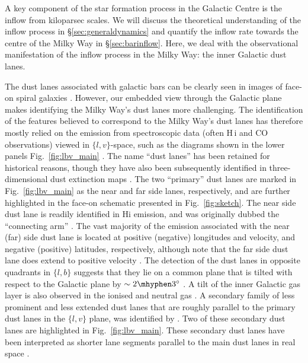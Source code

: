 A key component of the star formation process in the Galactic Centre is the inflow from kiloparsec scales. We will discuss the theoretical understanding of the inflow process in \S\ref{sec:generaldynamics} and quantify the inflow rate towards the centre of the Milky Way in \S\ref{sec:barinflow}. Here, we deal with the observational manifestation of the inflow process in the Milky Way: the inner Galactic dust lanes. 

The dust lanes associated with galactic bars can be clearly seen in images of face-on spiral galaxies \citep{Sandage1961,Knapen2002, Comeron2009, Lee2022}. However, our embedded view through the Galactic plane makes identifying the Milky Way's dust lanes more challenging. The identification of the features believed to correspond to the Milky Way's dust lanes has therefore mostly relied on the emission from spectroscopic data (often H\,{\sc i} and CO observations) viewed in $\{l,v\}$-space, such as the diagrams shown in the lower panels Fig.~\ref{fig:lbv_main} \citep[e.g.][]{Fux1999}. The name ``dust lanes'' has been retained for historical reasons, though they have also been subsequently identified in three-dimensional dust extinction maps \citep{Marshall2008}. The two ``primary'' dust lanes are marked in Fig.~\ref{fig:lbv_main} as the near and far side lanes, respectively, and are further highlighted in the face-on schematic presented in Fig.~\ref{fig:sketch}. The near side dust lane is readily identified in H{\sc i} emission, and was originally dubbed the ``connecting arm'' \citep[][]{Cohen1976, McClure-Griffiths2012}. The vast majority of the emission associated with the near (far) side dust lane is located at positive (negative) longitudes and velocity, and negative (positive) latitudes, respectively, although note that the far side dust lane does extend to positive velocity \citep[][]{Fux1999, Liszt2006, Liszt2008, Rodriguez-Fernandez2006, Sormani2019b}. The detection of the dust lanes in opposite quadrants in $\{l,b\}$ suggests that they lie on a common plane that is tilted with respect to the Galactic plane by $\sim2\mhyphen3^{\circ}$ \citep{Sormani2019b,Tress2020}. A tilt of the inner Galactic gas layer is also observed in the ionised and neutral gas \citep[e.g.][]{Krishnarao2020b}. A secondary family of less prominent and less extended dust lanes that are roughly parallel to the primary dust lanes in the $\{l,v\}$ plane, was identified by \citet{Liszt2008}. Two of these secondary dust lanes are highlighted in Fig.~\ref{fig:lbv_main}. These secondary dust lanes have been interpreted as shorter lane segments parallel to the main dust lanes in real space \citep[Fig.~\ref{fig:sketch};][]{Rodriguez-Fernandez2006,Sormani2019a}. 


